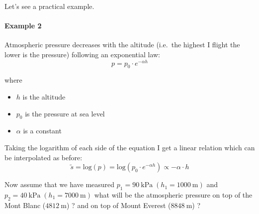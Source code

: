 \documentclass[11pt]{article}
\begin{document}
Let's see a practical example.

\hypertarget{example-2}{%
\paragraph{Example 2}\label{example-2}}

Atmospheric pressure decreases with the altitude (i.e.~the highest I
flight the lower is the pressure) following an exponential law:
\begin{equation}
p = p_0\cdot e^{-\alpha h}
\end{equation}

where
\begin{itemize}
\item $h$ is the altitude
\item $p_0$ is the pressure at sea level
\item $\alpha$ is a constant
\end{itemize}

Taking the logarithm of each side of the equation I get a linear
relation which can be interpolated as before:
\begin{equation}
  \tilde{s} = \mathrm{log}(p) = \mathrm{log}(p_0\cdot e^{-\alpha h})\propto - \alpha \cdot h
\end{equation}

Now assume that we have measured
\(p_1 = 90~\mathrm{kPa}\;(h_1 = 1000~\mathrm{m})\) and
\(p_2 = 40~\mathrm{kPa}\;(h_1 = 7000~\mathrm{m})\) what will be the
atmospheric pressure on top of the Mont Blanc (\(4812~\mathrm{m}\)) ?
and on top of Mount Everest (\(8848~\mathrm{m}\)) ?
\end{document}
